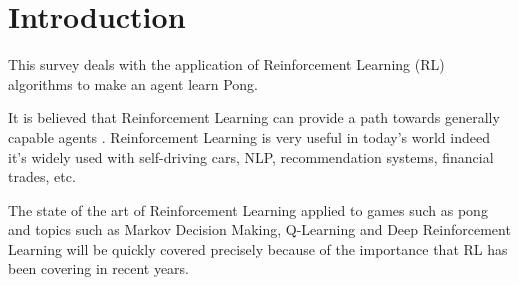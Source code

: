 \section{Introduction}

This survey deals with the application of Reinforcement Learning (RL) algorithms to make an agent learn Pong.

It is believed that Reinforcement Learning can provide a path towards generally capable agents \cite{silver2021reward} \cite{parker2022automated}.
Reinforcement Learning is very useful in today's world indeed it's widely used with self-driving cars, NLP, recommendation systems, financial trades, etc.

The state of the art of Reinforcement Learning applied to games such as pong and topics such as Markov Decision Making, Q-Learning and Deep Reinforcement Learning will be quickly covered precisely because of the importance that RL has been covering in recent years.
